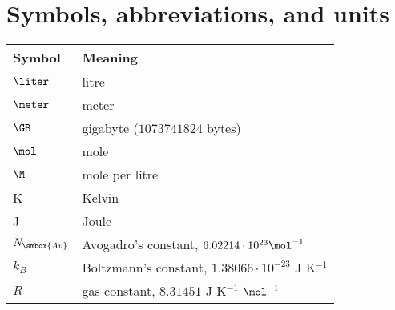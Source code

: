 
\chapter*{Symbols, abbreviations, and units}

\begin{center}
\setlongtables
\begin{longtable}{|l|l|}
\hline
\endhead
\hline
\endfoot
Symbol           & Meaning \\ \hline \hline
$\liter$         & litre                          \\
$\meter$         & meter                          \\
$\GB$            & gigabyte ($1073741824$ bytes)  \\
$\mol$           & mole                           \\
$\M$             & mole per litre                 \\
K                & Kelvin                         \\
J                & Joule                          \\
\hline

$N_{\smbox{Av}}$ & Avogadro's constant, $6.02214\cdot 10^{23}\mol^{-1}$ \\
$k_B$            & Boltzmann's constant, $1.38066\cdot 10^{-23}$ J K$^{-1}$ \\
$R$              & gas constant, $8.31451$ J K$^{-1}$ $\mol^{-1}$ \\
\hline


\end{longtable}
\end{center}
